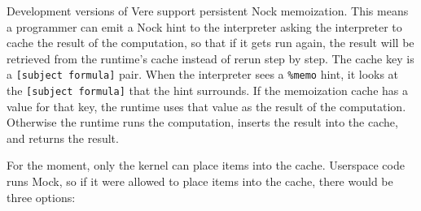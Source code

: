 \documentclass[twoside]{article}
\begin{document}
Development versions of Vere support persistent Nock memoization.  This means a programmer can emit a Nock hint to the interpreter asking the interpreter to cache the result of the computation, so that if it gets run again, the result will be retrieved from the runtime's cache instead of rerun step by step.  The cache key is a \lstinline[style=inlinecode]{[subject formula]} pair.  When the interpreter sees a \lstinline[style=inlinecode]{%memo} hint, it looks at the \lstinline[style=inlinecode]{[subject formula]} that the hint surrounds. If the memoization cache has a value for that key, the runtime uses that value as the result of the computation.  Otherwise the runtime runs the computation, inserts the result into the cache, and returns the result.

For the moment, only the kernel can place items into the cache.  Userspace code runs Mock, so if it were allowed to place items into the cache, there would be three options:
\end{document}
